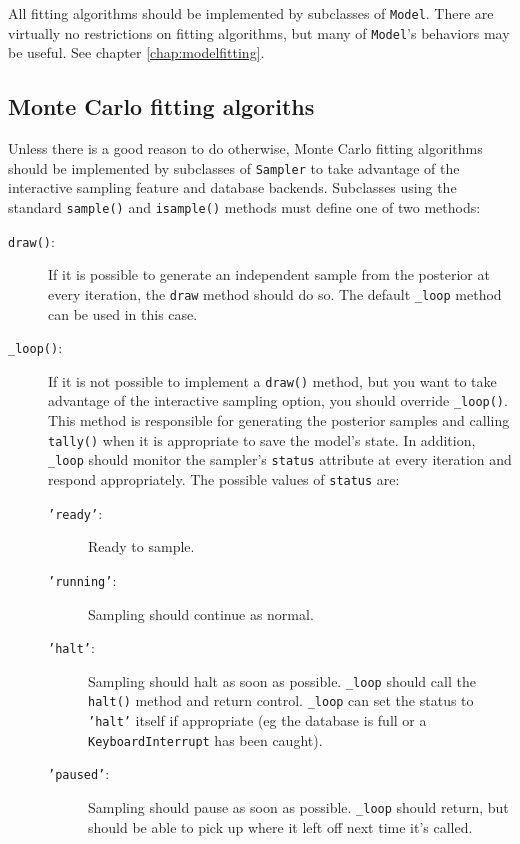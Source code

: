 All fitting algorithms should be implemented by subclasses of \texttt{Model}. There are virtually no restrictions on fitting algorithms, but many of \texttt{Model}'s behaviors may be useful. See chapter \ref{chap:modelfitting}. 

\hypertarget{custom-MC}{}
\subsection*{Monte Carlo fitting algoriths} \label{custom-MC}

Unless there is a good reason to do otherwise, Monte Carlo fitting algorithms should be implemented by subclasses of \texttt{Sampler} to take advantage of the interactive sampling feature and database backends. Subclasses using the standard \texttt{sample()} and \texttt{isample()} methods must define one of two methods:
\begin{description}
   \item[\texttt{draw()}:] If it is possible to generate an independent sample from the posterior at every iteration, the \texttt{draw} method should do so. The default \texttt{_loop} method can be used in this case.
   \item[\texttt{_loop()}:] If it is not possible to implement a \texttt{draw()} method, but you want to take advantage of the interactive sampling option, you should override \texttt{_loop()}. This method is responsible for generating the posterior samples and calling \texttt{tally()} when it is appropriate to save the model's state. In addition, \texttt{_loop} should monitor the sampler's \texttt{status} attribute at every iteration and respond appropriately. The possible values of \texttt{status} are:
   \begin{description}
      \item[\texttt{'ready'}:] Ready to sample.
      \item[\texttt{'running'}:] Sampling should continue as normal.
      \item[\texttt{'halt'}:] Sampling should halt as soon as possible. \texttt{_loop} should call the \texttt{halt()} method and return control. \texttt{_loop} can set the status to \texttt{'halt'} itself if appropriate (eg the database is full or a \texttt{KeyboardInterrupt} has been caught).
      \item[\texttt{'paused'}:] Sampling should pause as soon as possible. \texttt{_loop} should return, but should be able to pick up where it left off next time it's called.
   \end{description}
\end{description}


